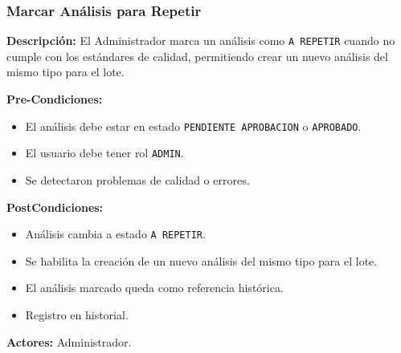 \subsubsection{Marcar Análisis para Repetir}

\textbf{Descripción:} El Administrador marca un análisis como \texttt{A REPETIR} cuando no cumple con los estándares de calidad, permitiendo crear un nuevo análisis del mismo tipo para el lote.

\vspace{0.5em}
\noindent\textbf{Pre-Condiciones:}
\begin{itemize}[nosep]
    \item El análisis debe estar en estado \texttt{PENDIENTE APROBACION} o \texttt{APROBADO}.
    \item El usuario debe tener rol \texttt{ADMIN}.
    \item Se detectaron problemas de calidad o errores.
\end{itemize}

\vspace{0.5em}
\noindent\textbf{PostCondiciones:}
\begin{itemize}[nosep]
    \item Análisis cambia a estado \texttt{A REPETIR}.
    \item Se habilita la creación de un nuevo análisis del mismo tipo para el lote.
    \item El análisis marcado queda como referencia histórica.
    \item Registro en historial.
\end{itemize}

\vspace{0.5em}
\noindent\textbf{Actores:} Administrador.

